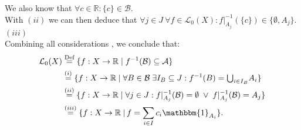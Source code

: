 \documentclass{article}
\begin{document}
We also know that $\forall c \in \mathbb{R}: \{c\} \in \mathcal{B}$.\\
With $(ii)$ we can then deduce that $\forall j \in J\  \forall f \in \mathcal{L}_0(X):  f|_{A_j}^{-1}( \{ c \} ) \in  \{ \emptyset, A_j \}  $. \hspace{2.4cm} $(iii)$\\
Combining all considerations , we conclude that: \vspace*{-0.5em}
\begin{align}
\noindent \notag \mathcal{L}_0(X) &\overset{\text{Def}}{=} \{ f:X \rightarrow \mathbb{R} \; | \; f^{-1}(\mathcal{B}) \subseteq \mathcal{A} \}\\
\notag & \overset{ (i) }{=} \{ f:X \rightarrow \mathbb{R} \; | \; \forall B \in \mathcal{B} \;\exists I_B \subseteq J:  f^{-1}(B) = \textstyle{\bigcup_{i \in I_B} } A_i \}\\
\notag & \overset{ (ii) }{=} \{ f:X \rightarrow \mathbb{R} \; | \; \forall j \in J : f|_{A_j}^{-1}(\mathcal{B}) = \emptyset \; \lor \;  f|_{A_j}^{-1}(\mathcal{B}) = A_j \}\\
\notag & \overset{ (iii) }{=} \{ f:X \rightarrow \mathbb{R} \; |  \, f = \sum_{i \in I} c_i \mathbbm{1}_{A_i}  \}.\\
\notag 
\end{align}
\end{document}
